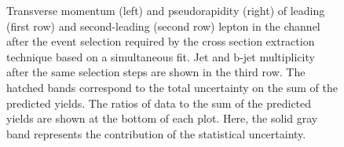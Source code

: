 \begin{figure}[htbp!]
\begin{center}
      \caption{Transverse momentum (left) and pseudorapidity (right)
        of leading (first row) and second-leading (second row) lepton in the \mumu channel after the
        event selection required by the \ttbar cross section
        extraction technique based on a simultaneous fit. Jet and b-jet multiplicity after the same selection steps are
        shown in the third row. The hatched
        bands correspond to the total uncertainty on the sum of the
        predicted yields. 
        The ratios of data to the sum of the predicted yields are
        shown at the bottom of each plot. Here, the solid gray band
        represents the contribution of the statistical uncertainty.}  
       \label{fig:xsec_mumu_ctrplots}
  \end{center}
\end{figure}

